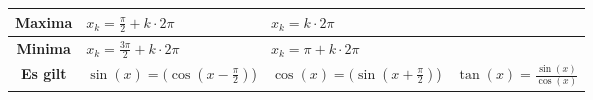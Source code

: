 \begin{tabularx}{1\textwidth} {
        | >{\raggedright\arraybackslash}c
        | >{\raggedright\arraybackslash}X
        | >{\raggedright\arraybackslash}X
        | >{\raggedright\arraybackslash}X |}
    \textbf{Maxima}             & $x_k = \frac{\pi}{2} + k \cdot 2\pi$                                 & $x_k = k \cdot 2\pi$                                                         &                                                                                        \\ \hline
    \textbf{Minima}             & $x_k = \frac{3\pi}{2} + k \cdot 2\pi$                                & $x_k = \pi + k \cdot 2\pi$                                                   &                                                                                        \\ \hline
    \textbf{Es gilt}            & $\sin(x)=(\cos(x-\frac{\pi}{2})$)                                    & $\cos(x)=(\sin(x+\frac{\pi}{2})$)                                            & $\tan(x)=\frac{\sin(x)}{\cos(x)}$                                                      \\ \hline
\end{tabularx}

\newpage
